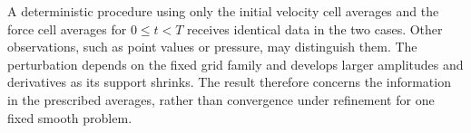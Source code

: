 A deterministic procedure using only the initial velocity cell averages
and the force cell averages for $0\le t<T$ receives identical data in the
two cases. Other observations, such as point values or pressure, may
distinguish them. The perturbation depends on the fixed grid family and
develops larger amplitudes and derivatives as its support shrinks. The
result therefore concerns the information in the prescribed averages,
rather than convergence under refinement for one fixed smooth problem.
